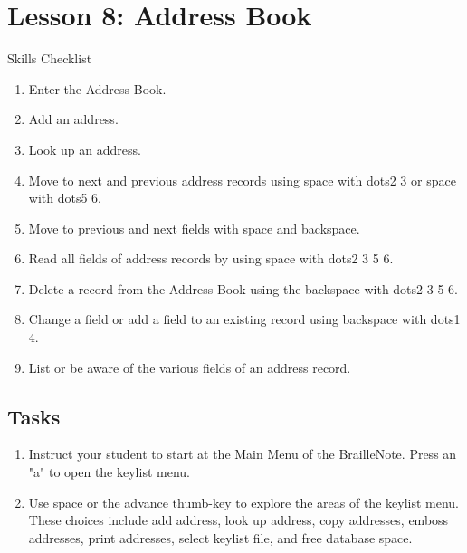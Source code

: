 \documentclass[10pt,letterpaper,twoside]{report}
\begin{document}
{{{{\section*{Lesson 8: Address Book}


Skills Checklist



\begin{enumerate}
	\item Enter the Address Book.
	      
	\item Add an address.
	      
	\item Look up an address.
	      
	\item Move to next and previous address records using space with dots2 3 or space with dots5 6.
	      
	\item Move to previous and next fields with space and backspace.
	      
	\item Read all fields of address records by using space with dots2 3 5 6.
	      
	\item Delete a record from the Address Book using the backspace with dots2 3 5 6.
	      
	\item Change a field or add a field to an existing record using backspace with dots1 4.
	      
	\item List or be aware of the various fields of an address record.
\end{enumerate}



 \subsection{Tasks}



\begin{enumerate}
	\item Instruct your student to start at the Main Menu of the BrailleNote. Press an "a" to open the keylist menu.
	      
	\item Use space or the advance thumb-key to explore the areas of the keylist menu.  These choices include add address, look up address, copy addresses, emboss addresses, print addresses, select keylist file, and free database space.
	      

\end{enumerate}}}}}
\end{document}
